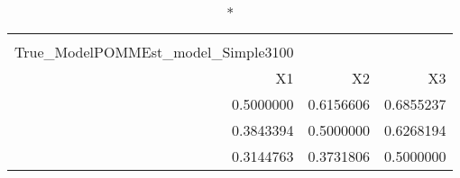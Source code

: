 \begin{longtable}{rrr}
\caption*{
{\large Pestmatrix} \\ 
{\small True\_ModelPOMMEst\_model\_Simple3100}
} \\ 
\toprule
X1 & X2 & X3 \\ 
\midrule
0.5000000 & 0.6156606 & 0.6855237 \\ 
0.3843394 & 0.5000000 & 0.6268194 \\ 
0.3144763 & 0.3731806 & 0.5000000 \\ 
\bottomrule
\end{longtable}

